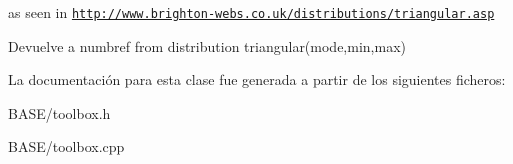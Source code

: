 as seen in \href{http://www.brighton-webs.co.uk/distributions/triangular.asp}{\tt http\+://www.\+brighton-\/webs.\+co.\+uk/distributions/triangular.\+asp} 

\begin{DoxyReturn}{Devuelve}
a numbref from distribution triangular(mode,min,max) 
\end{DoxyReturn}


La documentación para esta clase fue generada a partir de los siguientes ficheros\+:\begin{DoxyCompactItemize}
\item 
B\+A\+S\+E/toolbox.\+h\item 
B\+A\+S\+E/toolbox.\+cpp\end{DoxyCompactItemize}
